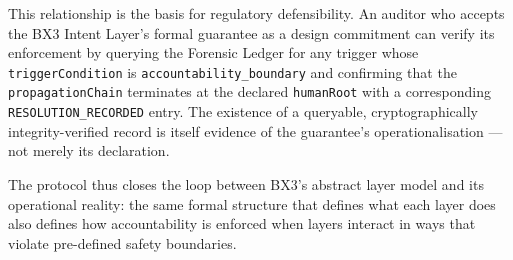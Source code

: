 This relationship is the basis for regulatory defensibility.  An auditor who
accepts the BX3 Intent Layer's formal guarantee as a design commitment can verify
its enforcement by querying the Forensic Ledger for any trigger whose
\texttt{triggerCondition} is \texttt{accountability\_boundary} and confirming that
the \texttt{propagationChain} terminates at the declared \texttt{humanRoot} with a
corresponding \texttt{RESOLUTION\_RECORDED} entry.  The existence of a queryable,
cryptographically integrity-verified record is itself evidence of the guarantee's
operationalisation — not merely its declaration.

The protocol thus closes the loop between BX3's abstract layer model and its
operational reality: the same formal structure that defines what each layer does
also defines how accountability is enforced when layers interact in ways that
violate pre-defined safety boundaries.